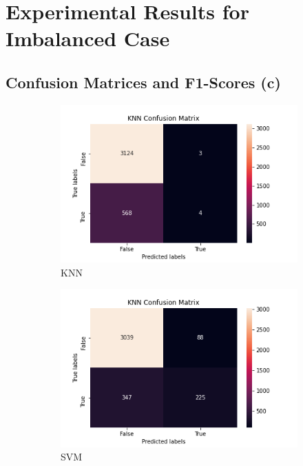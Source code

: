 \documentclass{article}
\begin{document}
\section{Experimental Results for Imbalanced Case}

\subsection{Confusion Matrices and F1-Scores (c)}

\begin{figure}[H]
\begin{subfigure}{.5\linewidth}
\centering
\includegraphics[scale=0.4]{KNN_confusionMatrix.png}
\caption{KNN}
\label{fig:knnMatrix}
\end{subfigure}%
\begin{subfigure}{.5\linewidth}
\centering
\includegraphics[scale=0.4]{SVM_confusionMatrix.png}
\caption{SVM}
\label{fig:svmMatrix}
\end{subfigure}\\[1ex]
\begin{subfigure}{.5\linewidth}
\centering

\end{subfigure}
\end{figure}
\end{document}
